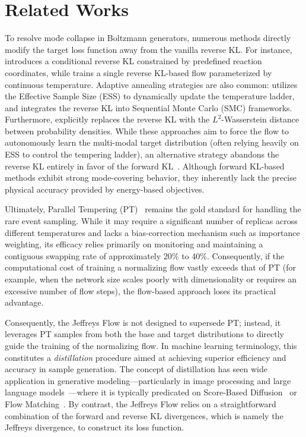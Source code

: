 \documentclass[%
 reprint,
 amsmath,amssymb,
 aps,
 pre,
]{revtex4-2}
\begin{document}
\section{Related Works}
\label{section: related works}

To resolve mode collapse in Boltzmann generators, numerous methods directly modify the target loss function away from the vanilla reverse KL. For instance, \cite{falkner2023conditioning} introduces a conditional reverse KL constrained by predefined reaction coordinates, while \cite{dibak2022temperature} trains a single reverse KL-based flow parameterized by continuous temperature. Adaptive annealing strategies are also common: \cite{wang2025mitigating} utilizes the Effective Sample Size (ESS) to dynamically update the temperature ladder, and \cite{matthews2022continual} integrates the reverse KL into Sequential Monte Carlo (SMC) frameworks. Furthermore, \cite{qiu2024efficient} explicitly replaces the reverse KL with the $L^2$-Wasserstein distance between probability densities. While these approaches aim to force the flow to autonomously learn the multi-modal target distribution (often relying heavily on ESS to control the tempering ladder), an alternative strategy abandons the reverse KL entirely in favor of the forward KL~\cite{gabrie2022adaptive, abernethy2024flow}. Although forward KL-based methods exhibit strong mode-covering behavior, they inherently lack the precise physical accuracy provided by energy-based objectives.

Ultimately, Parallel Tempering (PT)~\cite{earl2005parallel, syed2022non} remains the gold standard for handling the rare event sampling. While it may require a significant number of replicas across different temperatures and lacks a bias-correction mechanism such as importance weighting, its efficacy relies primarily on monitoring and maintaining a contiguous swapping rate of approximately 20\% to 40\%. Consequently, if the computational cost of training a normalizing flow vastly exceeds that of PT (for example, when the network size scales poorly with dimensionality or requires an excessive number of flow steps), the flow-based approach loses its practical advantage.

Consequently, the Jeffreys Flow is not designed to supersede PT; instead, it leverages PT samples from both the base and target distributions to directly guide the training of the normalizing flow.
In machine learning terminology, this constitutes a \emph{distillation} procedure aimed at achieving superior efficiency and accuracy in sample generation. The concept of distillation has seen wide application in generative modeling---particularly in image processing and large language models~\cite{luhman2021knowledge, zhou2024simple, xie2024distillation, fu2025moflow}---where it is typically predicated on Score-Based Diffusion~\cite{song2021maximum, batzolis2021conditional} or Flow Matching~\cite{lipman2022flow, chen2023flow}. By contrast, the Jeffreys Flow relies on a straightforward combination of the forward and reverse KL divergences, which is namely the Jeffreys divergence, to construct its loss function.
\end{document}
